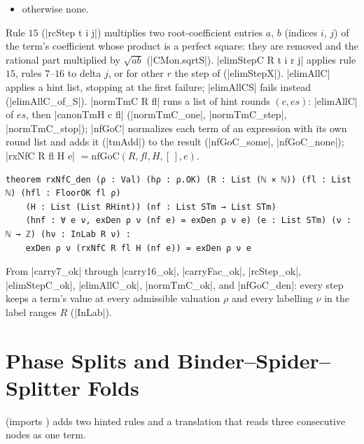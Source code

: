 \begin{definition}
\begin{itemize}
\item otherwise none.
\end{itemize}
Rule $15$ (\lean|rcStep t i j|) multiplies two root-coefficient entries $a$, $b$ (indices $i$, $j$) of the term's coefficient whose product is a perfect square: they are removed and the rational part multiplied by $\sqrt{ab}$ (\lean|CMon.sqrtS|). \lean|elimStepC R t i r j| applies rule $15$, rules $7$--$16$ to delta $j$, or for other $r$ the step of  (\lean|elimStepX|). \lean|elimAllC| applies a hint list, stopping at the first failure; \lean|elimAllCS| fails instead (\lean|elimAllC_of_S|). \lean|normTmC R fl| runs a list of hint rounds $(c,es)$: \lean|elimAllC| of $es$, then \lean|canonTmH c fl| (\lean|normTmC_one|, \lean|normTmC_step|, \lean|normTmC_stop|); \lean|nfGoC| normalizes each term of an expression with its own round list and adds it (\lean|tmAdd|) to the result (\lean|nfGoC_some|, \lean|nfGoC_none|); \lean|rxNfC R fl H e| $=\mathrm{nfGoC}(R,fl,H,[\,],e)$.
\end{definition}

\begin{theorem}\label{thm:lean-sym-rxNfC}
\begin{lstlisting}[style=lean]
theorem rxNfC_den (ρ : Val) (hρ : ρ.OK) (R : List (ℕ × ℕ)) (fl : List ℕ) (hfl : FloorOK fl ρ)
    (H : List (List RHint)) (nf : List STm → List STm)
    (hnf : ∀ e ν, exDen ρ ν (nf e) = exDen ρ ν e) (e : List STm) (ν : ℕ → ℤ) (hν : InLab R ν) :
    exDen ρ ν (rxNfC R fl H (nf e)) = exDen ρ ν e
\end{lstlisting}
From \lean|carry7_ok| through \lean|carry16_ok|, \lean|carryFac_ok|, \lean|rcStep_ok|, \lean|elimStepC_ok|, \lean|elimAllC_ok|, \lean|normTmC_ok|, and \lean|nfGoC_den|: every step keeps a term's value at every admissible valuation $\rho$ and every labelling $\nu$ in the label ranges $R$ (\lean|InLab|).
\end{theorem}

\section{Phase Splits and Binder--Spider--Splitter Folds}\label{sec:lean-sym-fold}

 (imports ) adds two hinted rules and a translation that reads three consecutive nodes as one term.

